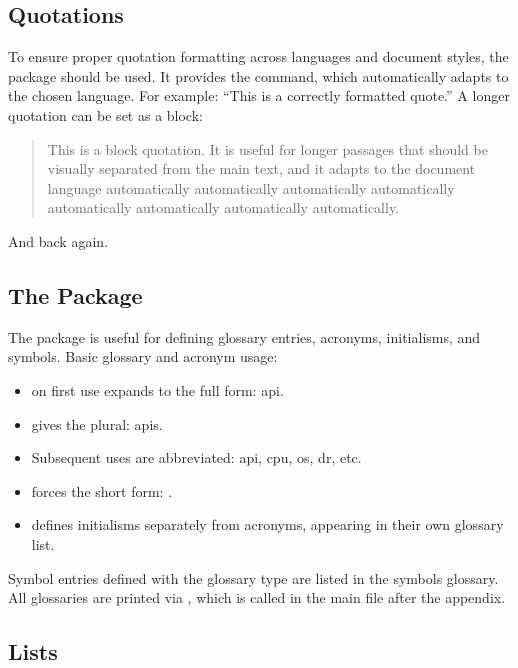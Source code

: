 \subsection{Quotations}

To ensure proper quotation formatting across languages and document styles, the  package should be used. It provides the \latexinline{\enquote} command, which automatically adapts to the chosen language. For example: \enquote{This is a correctly formatted quote.} A longer quotation can be set as a block:
\blockquote{This is a block quotation. It is useful for longer passages that should be visually separated from the main text, and it adapts to the document language automatically automatically automatically automatically automatically automatically automatically automatically.} And back again.

\subsection{The  Package}

The  package is useful for defining glossary entries, acronyms, initialisms, and symbols. Basic glossary and acronym usage:

\begin{itemize}
    \item \latexinline{\gls{}} on first use expands to the full form: \gls{api}.
    \item \latexinline{\glspl{}} gives the plural: \glspl{api}.
    \item Subsequent uses are abbreviated: \gls{api}, \gls{cpu}, \gls{os}, \gls{dr}, \gls{etc}.
    \item \latexinline{\glsxtrshort{}} forces the short form: .
    \item \latexinline{\newinitialism{}} defines initialisms separately from acronyms, appearing in their own glossary list.
\end{itemize}

Symbol entries defined with the  glossary type are listed in the symbols glossary. All glossaries are printed via \latexinline{\printglossaries}, which is called in the main file after the appendix.

\subsection{Lists}

